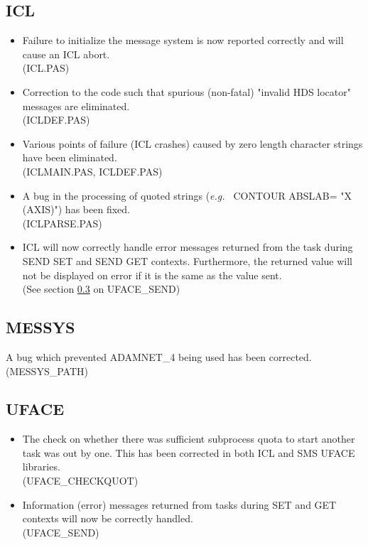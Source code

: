 \subsection{ICL}
\begin{itemize}
\item Failure to initialize the message system is now reported correctly
and will cause an ICL abort.\\
(ICL.PAS)
\item Correction to the code such that spurious (non-fatal) "invalid HDS
locator" messages are eliminated.\\
(ICLDEF.PAS)
\item Various points of failure (ICL crashes) caused by zero length character
strings have been eliminated.\\
(ICLMAIN.PAS, ICLDEF.PAS)
\item A bug in the processing of quoted strings ({\em e.g.\ } CONTOUR ABSLAB=
"X (AXIS)") has been fixed.\\
(ICLPARSE.PAS)
\item ICL will now correctly handle error messages returned from the task
during SEND SET and SEND GET contexts. Furthermore, the returned value will 
not be displayed on error if it is the same as the value sent.\\
(See section \ref{ufbugs} on UFACE\_SEND)
\end{itemize}

\subsection{MESSYS}
A bug which prevented ADAMNET\_4 being used has been corrected.\\
(MESSYS\_PATH)

\subsection{UFACE}
\label{ufbugs}
\begin{itemize}
\item The check on whether there was sufficient subprocess quota to start another
task was out by one. This has been corrected in both ICL and SMS UFACE
libraries.\\
(UFACE\_CHECKQUOT)
\item Information (error) messages returned from tasks during SET and GET 
contexts will now be correctly handled.\\
(UFACE\_SEND)
\end{itemize}

